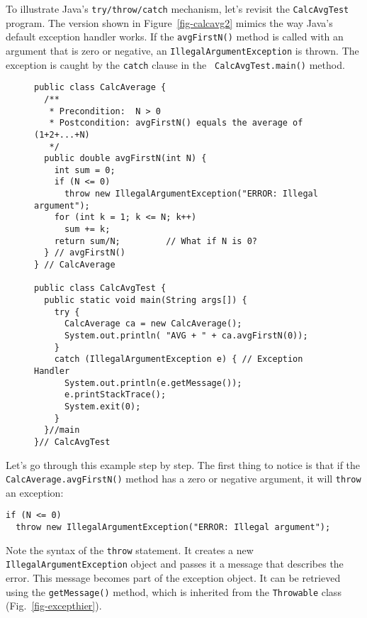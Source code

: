 To illustrate Java's {\tt try/throw/catch} mechanism, let's revisit the
{\tt Calc\-Avg\-Test} program.  The version shown in
Figure~\ref{fig-calcavg2} mimics the way Java's default exception
handler works. If the {\tt avgFirstN()} method is called with an
argument that is zero or negative, an {\tt IllegalArgumentException} 
is thrown.  The exception is caught by the {\tt catch} clause in the {\tt
CalcAvgTest.main()} method.

\begin{figure}[tb]
\jjjprogstart
\begin{jjjlisting}[30.5pc]
\begin{lstlisting}
public class CalcAverage {
  /**
   * Precondition:  N > 0
   * Postcondition: avgFirstN() equals the average of (1+2+...+N)
   */
  public double avgFirstN(int N) {
    int sum = 0;
    if (N <= 0)
      throw new IllegalArgumentException("ERROR: Illegal argument");
    for (int k = 1; k <= N; k++)
      sum += k;
    return sum/N;         // What if N is 0?
  } // avgFirstN()
} // CalcAverage

public class CalcAvgTest {
  public static void main(String args[]) {
    try {
      CalcAverage ca = new CalcAverage();
      System.out.println( "AVG + " + ca.avgFirstN(0));        
    } 
    catch (IllegalArgumentException e) { // Exception Handler
      System.out.println(e.getMessage());
      e.printStackTrace();
      System.exit(0);
    }
  }//main
}// CalcAvgTest
\end{lstlisting}
\end{jjjlisting}
\end{figure}

Let's go through this example step by step.  The first thing to
notice is that if the {\tt CalcAverage.avg\-FirstN()} method has 
a zero or negative argument, it will {\tt throw} an exception:

\begin{jjjlisting}[28.5pc]
\begin{lstlisting}
if (N <= 0)
  throw new IllegalArgumentException("ERROR: Illegal argument");
\end{lstlisting}
\end{jjjlisting}

\noindent Note the syntax of the {\tt throw} statement.
It creates a new {\tt Illegal\-Argument\-Exception} object and passes
it a message that describes the error. This message becomes part of
the exception object. It can be retrieved using the {\tt getMessage()}
method, which is inherited from the {\tt Throwable} class
(Fig.~\ref{fig-excepthier}).

